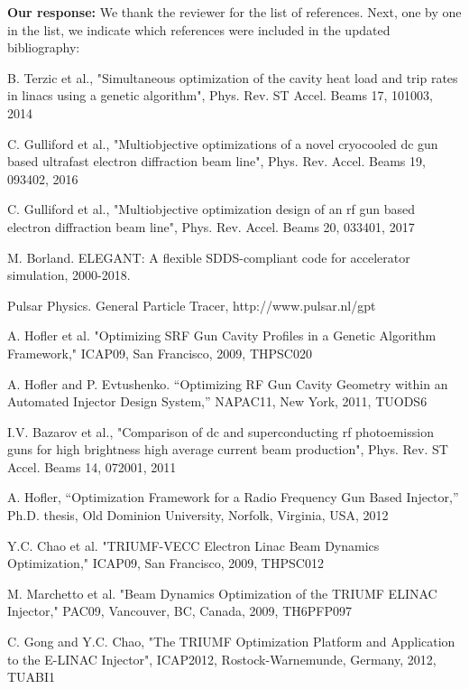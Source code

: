 \documentclass{article}
\begin{document}
{\bf Our response:} {\color{blue} 	We thank the reviewer for the list of references. 
	Next, one by one in the list, we indicate which references were included in the updated bibliography: 
}


{\color{blue}{Included in updated bibliography (in addition to two references above):}}

B. Terzic et al., "Simultaneous optimization of the cavity heat load
and trip rates in linacs using a genetic algorithm", Phys. Rev. ST
Accel. Beams 17, 101003, 2014

C. Gulliford et al., "Multiobjective optimizations of a novel
cryocooled dc gun based ultrafast electron diffraction beam line",
Phys. Rev. Accel. Beams 19, 093402, 2016

C. Gulliford et al., "Multiobjective optimization design of an rf gun
based electron diffraction beam line", Phys. Rev. Accel. Beams 20,
033401, 2017

M. Borland. ELEGANT: A flexible SDDS-compliant code for accelerator simulation, 2000-2018.
{\color{blue}{(slightly updated this reference)}}

Pulsar Physics. General Particle Tracer, http://www.pulsar.nl/gpt

{\color{blue}{Exluded from updated bibliography, because they are in A. Hofler 13':}}

A. Hofler et al. "Optimizing SRF Gun Cavity Profiles in a Genetic
Algorithm Framework," ICAP09, San Francisco, 2009, THPSC020 


A. Hofler and P. Evtushenko. “Optimizing RF Gun Cavity Geometry within
an Automated Injector Design System,” NAPAC11, New York, 2011, TUODS6

I.V. Bazarov et al., "Comparison of dc and superconducting rf
photoemission guns for high brightness high average current beam
production", Phys. Rev. ST Accel. Beams 14, 072001, 2011

A. Hofler, “Optimization Framework for a Radio Frequency Gun Based
Injector,” Ph.D. thesis, Old Dominion University, Norfolk, Virginia,
USA, 2012

{\color{blue}{Excluded because of similarity to other references or scope of paper:}}

Y.C. Chao et al. "TRIUMF-VECC Electron Linac Beam Dynamics
Optimization," ICAP09, San Francisco, 2009, THPSC012

M. Marchetto et al. "Beam Dynamics Optimization of the TRIUMF ELINAC
Injector," PAC09, Vancouver, BC, Canada, 2009, TH6PFP097

C. Gong and Y.C. Chao, "The TRIUMF Optimization Platform and
Application to the E-LINAC Injector", ICAP2012, Rostock-Warnemunde,
Germany, 2012, TUABI1
\end{document}
